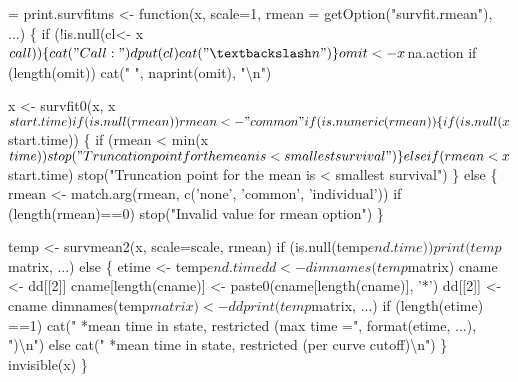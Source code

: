 \documentclass{article}
\begin{document}
\begin{nwchunk}
=
 print.survfitms <- function(x, scale=1,
                             rmean = getOption("survfit.rmean"), ...) \{
     if (!is.null(cl<- x$call)) \{
         cat("Call: ")
         dput(cl)
         cat("{\textbackslash}n")
         \}        
     omit <- x$na.action
     if (length(omit)) cat("  ", naprint(omit), "{\textbackslash}n")
 
     x <- survfit0(x, x$start.time)
     if (is.null(rmean)) rmean <- "common"
     if (is.numeric(rmean)) \{
         if (is.null(x$start.time)) \{
             if (rmean < min(x$time)) 
                 stop("Truncation point for the mean is < smallest survival")
         \}
         else if (rmean < x$start.time)
             stop("Truncation point for the mean is < smallest survival")
     \}
     else \{
         rmean <- match.arg(rmean, c('none', 'common', 'individual'))
         if (length(rmean)==0) stop("Invalid value for rmean option")
     \}
 
     temp <- survmean2(x, scale=scale, rmean)
     if (is.null(temp$end.time)) print(temp$matrix, ...)
     else \{
         etime <- temp$end.time
         dd <- dimnames(temp$matrix)
         cname <- dd[[2]]
         cname[length(cname)] <- paste0(cname[length(cname)], '*')
         dd[[2]] <- cname
         dimnames(temp$matrix) <- dd
         print(temp$matrix, ...)
         if (length(etime) ==1)
              cat("   *mean time in state, restricted (max time =", 
                  format(etime, ...), "){\textbackslash}n")
         else cat("   *mean time in state, restricted (per curve cutoff){\textbackslash}n")
     \}
     invisible(x)
 \}
\end{nwchunk}
\end{document}
